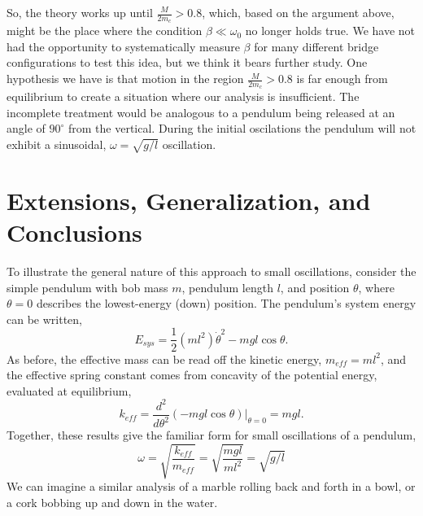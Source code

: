 \documentclass[12pt]{iopart}
\newcommand{\be}{\begin{equation}}
\newcommand{\ee}{\end{equation}}
\begin{document}
So, the theory works up until $\frac{M}{2m_c}>0.8$, which, based on the argument above, might be the place where the condition $\beta \ll \omega_0$ no longer holds true.   We have not had the opportunity to systematically measure $\beta$ for many different bridge configurations to test this idea, but we think it bears further study.  
One hypothesis we have is that motion in the region $\frac{M}{2m_c} > 0.8$ is far enough from equilibrium to create a situation where our analysis is insufficient. The incomplete treatment would be analogous to a pendulum being released at an angle of $90^{\circ}$ from the vertical. During the initial oscilations the pendulum will not exhibit a sinusoidal, $\omega=\sqrt{g/l}$ oscillation.
%
%

\section{Extensions, Generalization, and Conclusions}
To illustrate the general nature of this approach to small oscillations, consider the simple pendulum with bob mass $m$, pendulum length $l$, and position $\theta$, where $\theta=0$ describes the lowest-energy (down) position.  The pendulum's system energy can be written,
\be
E_{sys}=\frac{1}{2}\left(m l^2 \right) \dot{\theta}^2-mgl\cos \theta.
\ee 
As before, the effective mass can be read off the kinetic energy, 
$m_{eff}=ml^2$, 
and the effective spring constant comes from concavity of the potential energy, evaluated at equilibrium,
\be
k_{eff}=\frac{ d^2 }{ d \theta ^2 } (-m g l \cos \theta) |_{\theta=0}=mgl.
\ee
Together, these results give the familiar form for small oscillations of a pendulum, 
\be
\omega=\sqrt{\frac{k_{eff}}{m_{eff}}} = \sqrt{\frac{mgl}{m l^2}}=\sqrt{g/l}
\ee
We can imagine a similar analysis of a marble rolling back and forth in a bowl, or a cork bobbing up and down in the water. 
\end{document}
